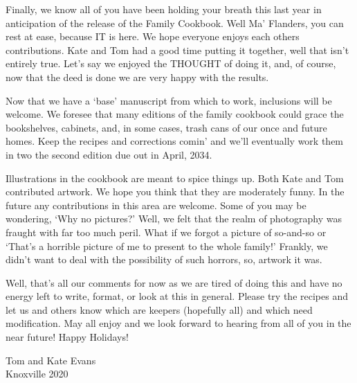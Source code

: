 \documentclass[12pt]{article}
\begin{document}
{\color{red}
Finally, we know all of you have been holding your breath this last year
in anticipation of the release of the Family Cookbook.  Well Ma'
Flanders, you can rest at ease, because IT is here.  We hope everyone
enjoys each others contributions.  Kate and Tom had a good time putting it
together, well that isn't entirely true.  Let's say we enjoyed the
THOUGHT of doing it, and, of course, now that the deed is done we are
very happy with the results.

Now that we have a `base' manuscript from which to work, inclusions will
be welcome.  We foresee that many editions of the family cookbook could
grace the bookshelves, cabinets, and, in some cases, trash cans of our
once and future homes.  Keep the recipes and corrections comin' and we'll
eventually work them in two the second edition due out in April, 2034.

Illustrations in the cookbook are meant to spice things up. Both Kate and
Tom contributed artwork.  We hope you think that they are moderately
funny.  In the future any contributions in this area are welcome.  Some
of you may be wondering, `Why no pictures?'  Well, we felt that the realm
of photography was fraught with far too much peril.  What if we forgot a
picture of so-and-so or `That's a horrible picture of me to present to
the whole family!'  Frankly, we didn't want to deal with the possibility
of such horrors, so, artwork it was.

Well, that's all our comments for now as we are tired of doing this and
have no energy left to write, format, or look at this in general.  Please
try the recipes and let us and others know which are keepers (hopefully
all) and which need modification.  May all enjoy and we look forward to
hearing from all of you  in the near future!  Happy Holidays!
}

\vspace{.5in}
\begin{flushright}
Tom and Kate Evans\\ Knoxville 2020
\end{flushright}

\end{document}
